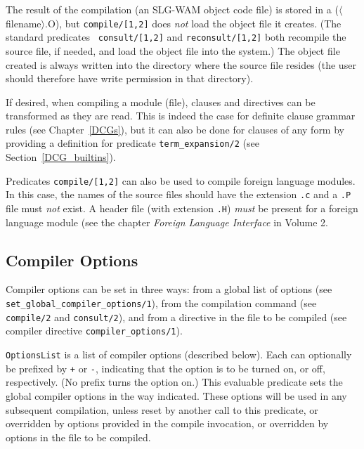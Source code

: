 The result of the compilation (an SLG-WAM object code file) is stored
in a ($\langle$filename$\rangle$.O), but {\tt compile/[1,2]} does {\em
not\/} load the object file it creates.  (The standard predicates {\tt
consult/[1,2]} and {\tt reconsult/[1,2]} both recompile the source
file, if needed, and load the object file into the system.)  The
object file created is always written into the directory where the
source file resides (the user should therefore have write permission
in that directory).
 
If desired, when compiling a module (file), clauses and directives can be
transformed as they are read.  This is indeed the case for definite clause
grammar rules (see Chapter~\ref{DCGs}), but it can also be done for clauses
of any form by providing a definition for predicate {\tt term\_expansion/2}
(see Section~\ref{DCG_builtins}).

Predicates {\tt compile/[1,2]} can also be used to compile foreign
language modules.  In this case, the names of the source files should
have the extension {\tt .c} and a {\tt .P} file must {\em not\/}
exist.  A header file (with extension {\tt .H}) {\em must} be present
for a foreign language module (see the chapter {\it Foreign Language
Interface} in Volume 2.


\subsection{Compiler Options}\label{sec:CompilerOptions}

Compiler options can be set in three ways: from a global list of
options (see {\tt set\_global\_compiler\_options/1}), from the
compilation command (see {\tt compile/2} and {\tt consult/2}), and
from a directive in the file to be compiled (see compiler directive
{\tt compiler\_options/1}).

\begin{description}
    {\tt OptionsList} is a list of compiler options (described below).
    Each can optionally be prefixed by \verb|+| or \verb|-|,
    indicating that the option is to be turned on, or off,
    respectively.  (No prefix turns the option on.)  This evaluable
    predicate sets the global compiler options in the way indicated.
    These options will be used in any subsequent compilation, unless
    reset by another call to this predicate, or overridden by options
    provided in the compile invocation, or overridden by options in
    the file to be compiled.
\end{description}


